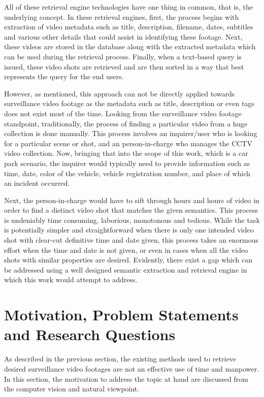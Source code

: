 All of these retrieval engine technologies have one thing in common, that is, the underlying concept. In these retrieval engines, first, the process begins with extraction of video metadata such as title, description, filename, dates, subtitles and various other details that could assist in identifying these footage. Next, these videos are stored in the database along with the extracted metadata which can be used during the retrieval process. Finally, when a text-based query is issued, these video shots are retrieved and are then sorted in a way that best represents the query for the end users. 

However, as mentioned, this approach can not be directly applied towards surveillance video footage as the metadata such as title, description or even tags does not exist most of the time. Looking from the surveillance video footage standpoint, traditionally, the process of finding a particular video from a huge collection is done manually. This process involves an inquirer/user who is looking for a particular scene or shot, and an person-in-charge who manages the CCTV video collection. Now, bringing that into the scope of this work, which is a car park scenario, the inquirer would typically need to provide information such as time, date, color of the vehicle, vehicle registration number, and place of which an incident occurred. %

Next, the person-in-charge would have to sift through hours and hours of video in order to find a distinct video shot that matches the given semantics. This process is undeniably time consuming, laborious, monotonous and tedious. While the task is potentially simpler and straightforward when there is only one intended video shot with clear-cut definitive time and date given, this process takes an enormous effort when the time and date is not given, or even in cases when all the video shots with similar properties are desired. Evidently, there exist a gap which can be addressed using a well designed semantic extraction and retrieval engine in which this work would attempt to address.

\section{Motivation, Problem Statements and Research Questions}

As described in the previous section, the existing methods used to retrieve desired surveillance video footages are not an effective use of time and manpower. In this section, the motivation to address the topic at hand are discussed from the computer vision and natural viewpoint.

